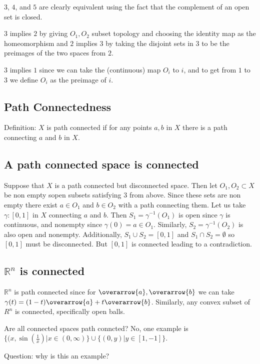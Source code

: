 \documentclass{homework}
\newcommand{\RR}{\mathbb{R}}
\begin{document}
$3$, $4$, and $5$ are clearly equivalent using the fact that the complement of an open set is closed. 

$3$ implies $2$ by giving $O_1,O_2$ subset topology and choosing the identity map as the homeomorphism and $2$ implies $3$ by taking the disjoint sets in $3$ to be the preimages of the two spaces from $2$.

$3$ implies $1$ since we can take the (continuous) map $O_i$ to $i$, and to get from $1$ to $3$ we define $O_i$ as the preimage of $i$. 

\subsection{Path Connectedness}

Definition: $X$ is path connected if for any points $a,b$ in $X$ there is a path connecting $a$ and $b$ in $X$. 


\subsection{A path connected space is connected}

Suppose that $X$ is a path connected but disconnected space. Then let $O_1,O_2 \subset X$ be non empty sopen subsets satisfying $3$ from above. Since these sets are non empty there exist $a \in O_1$ and $b \in O_2$ with a path connecting them. Let us take $\gamma: [0,1]$ in $X$ connecting $a$ and $b$. Then $S_1 = \gamma^{-1}(O_1)$ is open since $\gamma$ is continuous, and nonempty since $\gamma(0) = a \in O_1$. Similarly, $S_2 = \gamma^{-1}(O_2)$ is also open and nonempty. Additionally, $S_1 \cup S_2 = [0,1]$ and $S_1 \cap S_2 = \emptyset$ so $[0,1]$ must be disconnected. But $[0,1]$ is connected leading to a contradiction. 


\subsection{$\mathbb{R}^n$ is connected}
$\RR^n$ is path connected since for $\overarrow{a},\overarrow{b}$ we can take $\gamma(t) = (1 - t)\overarrow{a} + t \overarrow{b}$. Similarly, any convex subset of $R^n$ is connected, specifically open balls. 


Are all connected spaces path conncted? No, one example is $\{(x,\sin\left(\frac{1}{x}\right) | x \in (0,\infty)\} \cup \{(0,y) | y \in [1,-1]\}$.

Question: why is this an example?
\end{document}
